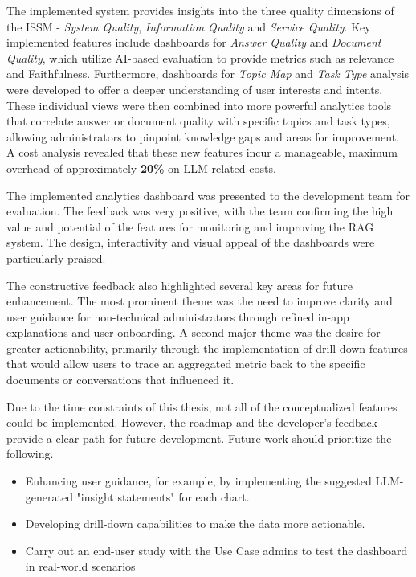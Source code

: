 \documentclass[
	english,
	ruledheaders=section,%
	class=report,%
	thesis={type=bachelor},%
	accentcolor=1b,%
	custommargins=true,%
	marginpar=false,%
	parskip=half-,%
	fontsize=11pt,%
	DIV=14,
]{tudapub}
\begin{document}
The implemented system provides insights into the three quality dimensions of the ISSM \parencite{DeloneMcLean2003ISSuccessTenYearUpdate} - \textit{System Quality}, \textit{Information Quality} and \textit{Service Quality}. Key implemented features include dashboards for \textit{Answer Quality} and \textit{Document Quality}, which utilize AI-based evaluation to provide metrics such as relevance and Faithfulness. Furthermore, dashboards for \textit{Topic Map} and \textit{Task Type} analysis were developed to offer a deeper understanding of user interests and intents. These individual views were then combined into more powerful analytics tools that correlate answer or document quality with specific topics and task types, allowing administrators to pinpoint knowledge gaps and areas for improvement. A cost analysis revealed that these new features incur a manageable, maximum overhead of approximately \textbf{20\%} on LLM-related costs.

The implemented analytics dashboard was presented to the development team for evaluation. The feedback was very positive, with the team confirming the high value and potential of the features for monitoring and improving the RAG system. The design, interactivity and visual appeal of the dashboards were particularly praised.

The constructive feedback also highlighted several key areas for future enhancement. The most prominent theme was the need to improve clarity and user guidance for non-technical administrators through refined in-app explanations and user onboarding. A second major theme was the desire for greater actionability, primarily through the implementation of drill-down features that would allow users to trace an aggregated metric back to the specific documents or conversations that influenced it.

Due to the time constraints of this thesis, not all of the conceptualized features could be implemented. However, the roadmap and the developer's feedback provide a clear path for future development. Future work should prioritize the following.
\begin{itemize}
    \item Enhancing user guidance, for example, by implementing the suggested LLM-generated "insight statements" for each chart.
    \item Developing drill-down capabilities to make the data more actionable.
    \item Carry out an end-user study with the Use Case admins to test the dashboard in real-world scenarios
\end{itemize}
\end{document}
